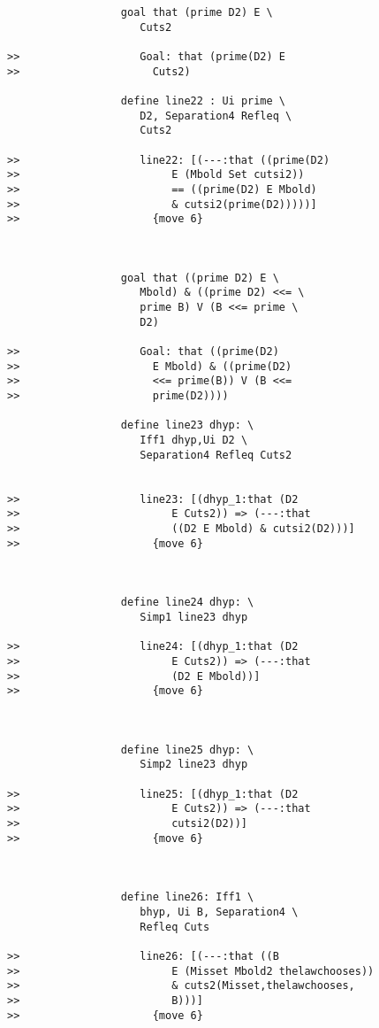 \documentclass[12pt]{article}
\begin{document}
\begin{verbatim}
                  goal that (prime D2) E \
                     Cuts2

>>                   Goal: that (prime(D2) E
>>                     Cuts2)

                  define line22 : Ui prime \
                     D2, Separation4 Refleq \
                     Cuts2

>>                   line22: [(---:that ((prime(D2)
>>                        E (Mbold Set cutsi2))
>>                        == ((prime(D2) E Mbold)
>>                        & cutsi2(prime(D2)))))]
>>                     {move 6}



                  goal that ((prime D2) E \
                     Mbold) & ((prime D2) <<= \
                     prime B) V (B <<= prime \
                     D2)

>>                   Goal: that ((prime(D2)
>>                     E Mbold) & ((prime(D2)
>>                     <<= prime(B)) V (B <<=
>>                     prime(D2))))

                  define line23 dhyp: \
                     Iff1 dhyp,Ui D2 \
                     Separation4 Refleq Cuts2


>>                   line23: [(dhyp_1:that (D2
>>                        E Cuts2)) => (---:that
>>                        ((D2 E Mbold) & cutsi2(D2)))]
>>                     {move 6}



                  define line24 dhyp: \
                     Simp1 line23 dhyp

>>                   line24: [(dhyp_1:that (D2
>>                        E Cuts2)) => (---:that
>>                        (D2 E Mbold))]
>>                     {move 6}



                  define line25 dhyp: \
                     Simp2 line23 dhyp

>>                   line25: [(dhyp_1:that (D2
>>                        E Cuts2)) => (---:that
>>                        cutsi2(D2))]
>>                     {move 6}



                  define line26: Iff1 \
                     bhyp, Ui B, Separation4 \
                     Refleq Cuts

>>                   line26: [(---:that ((B
>>                        E (Misset Mbold2 thelawchooses))
>>                        & cuts2(Misset,thelawchooses,
>>                        B)))]
>>                     {move 6}




\end{verbatim}
\end{document}
